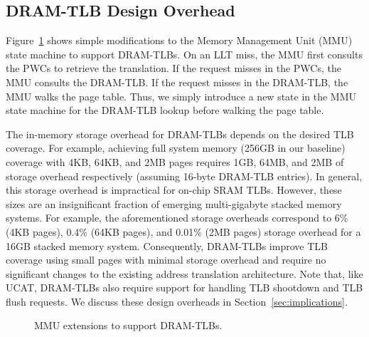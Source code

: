 \subsection{DRAM-TLB Design Overhead}

\noindent Figure~\ref{fig:mmu_state} shows simple modifications to the
Memory Management Unit (MMU) state machine to support DRAM-TLBs. On an
LLT miss, the MMU first consults the PWCs to retrieve the translation.
If the request misses in the PWCs, the MMU consults the DRAM-TLB. If
the request misses in the DRAM-TLB, the MMU walks the page table.
Thus, we simply introduce a new state in the MMU state machine for the
DRAM-TLB lookup before walking the page table.

The in-memory storage overhead for DRAM-TLBs depends on the desired
TLB coverage. For example, achieving full system memory (256GB in our
baseline) coverage with 4KB, 64KB, and 2MB pages requires 1GB, 64MB,
and 2MB of storage overhead respectively (assuming 16-byte DRAM-TLB
entries). In general, this storage overhead is impractical for on-chip
SRAM TLBs. However, these sizes are an insignificant fraction of
emerging multi-gigabyte stacked memory systems. For example, the
aforementioned storage overheads correspond to 6\% (4KB pages), 0.4\%
(64KB pages), and 0.01\% (2MB pages) storage overhead for a 16GB
stacked memory system. Consequently, DRAM-TLBs improve TLB coverage
using small pages with minimal storage overhead and require no
significant changes to the existing address translation architecture.
Note that, like UCAT, DRAM-TLBs also require support for handling TLB
shootdown and TLB flush requests. We discuss these design overheads in
Section~\ref{sec:implications}.

\begin{figure}[b] 
  \vspace{-0. in} \centering
  \centerline{}

  \caption{\small MMU extensions to support DRAM-TLBs.
    \normalsize}
  \label{fig:mmu_state} 
  \vspace{-0 in}
\end{figure}



% 



